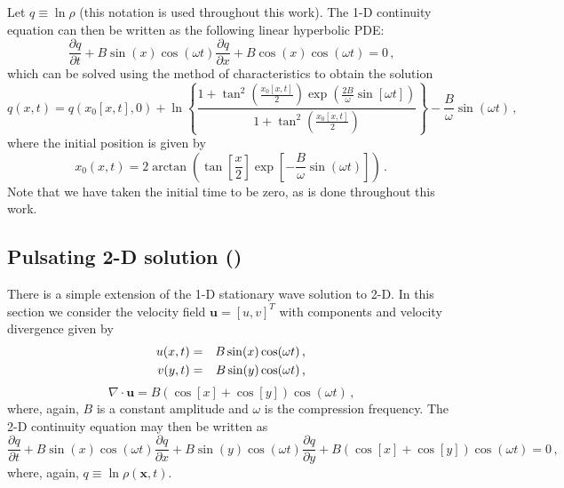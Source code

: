 \documentclass[11pt]{book}
\begin{document}
Let $q \equiv \ln \rho$ (this notation is used throughout this work).  The 1-D continuity equation can then be written as the following linear hyperbolic PDE:
\begin{equation}
\label{eqn_cont1d}
\frac{\partial q}{\partial t} + B \sin(x) \cos(\omega t) \frac{\partial q}{\partial x} + B \cos(x) \cos(\omega t) = 0 \,\mbox{,}
\end{equation}
which can be solved using the method of characteristics to obtain the solution
\begin{equation}
\label{eqn_1dsoln}
q(x,t) = q(x_0[x,t],0) + \ln \left\{ \frac{ 1 + \tan^2\left(\frac{x_0[x,t]}{2}\right) \exp\left(\frac{2B}{\omega}\sin[\omega t]\right) }{ 1 + \tan^2\left(\frac{x_0[x,t]}{2}\right) } \right\} - \frac{B}{\omega} \sin(\omega t) \,\mbox{,}
\end{equation}
where the initial position is given by
\begin{equation}
\label{eqn_initialposition1d}
x_0(x,t) = 2 \arctan\left( \tan\left[\frac{x}{2}\right] \exp\left[-\frac{B}{\omega}\sin(\omega t)\right] \right) \,\mbox{.}
\end{equation}
Note that we have taken the initial time to be zero, as is done throughout this work.


\subsection{Pulsating 2-D solution (\texorpdfstring{}{pulsating})}
\label{soln_2d}

There is a simple extension of the 1-D stationary wave solution to 2-D. In this section we consider the velocity field $\mathbf{u}=[u,v]^T$ with components and velocity divergence given by
\begin{eqnarray}
\label{eqn_u2d}
u(x,t) &=& B \sin(x) \cos(\omega t) \,\mbox{,} \vspace{0.2cm}\\
v(y,t) &=& B \sin(y) \cos(\omega t) \,\mbox{,}
\end{eqnarray}
\begin{equation}
\label{eqn_div2d}
\nabla\cdot\mathbf{u} = B(\cos[x] + \cos[y]) \cos(\omega t) \,\mbox{,}
\end{equation}
where, again, $B$ is a constant amplitude and $\omega$ is the compression frequency.  The 2-D continuity equation may then be written as
\begin{equation}
\label{eqn_cont2d}
\frac{\partial q}{\partial t} + B \sin(x) \cos(\omega t) \frac{\partial q}{\partial x} + B \sin(y) \cos(\omega t) \frac{\partial q}{\partial y} + B( \cos[x] + \cos[y]) \cos(\omega t) = 0 \,\mbox{,}
\end{equation}
where, again, $q \equiv \ln \rho(\mathbf{x},t)$.
\end{document}
